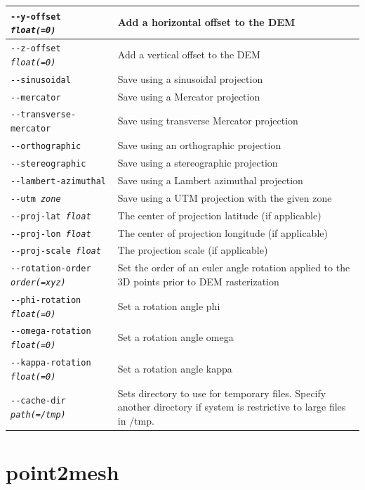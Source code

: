 \begin{longtable}{|l|p{10cm}|}
\texttt{-\/-y-offset \textit{float(=0)}} & Add a horizontal offset to the \ac{DEM} \\ \hline
\texttt{-\/-z-offset \textit{float(=0)}} & Add a vertical offset to the \ac{DEM} \\ \hline
\texttt{-\/-sinusoidal} & Save using a sinusoidal projection \\ \hline
\texttt{-\/-mercator} & Save using a Mercator projection \\ \hline
\texttt{-\/-transverse-mercator} & Save using transverse Mercator projection \\ \hline
\texttt{-\/-orthographic} & Save using an orthographic projection \\ \hline
\texttt{-\/-stereographic} & Save using a stereographic projection \\ \hline
\texttt{-\/-lambert-azimuthal} & Save using a Lambert azimuthal projection \\ \hline
\texttt{-\/-utm \textit{zone}} & Save using a UTM projection with the given zone \\ \hline
\texttt{-\/-proj-lat \textit{float}} & The center of projection latitude (if applicable) \\ \hline
\texttt{-\/-proj-lon \textit{float}} & The center of projection longitude (if applicable) \\ \hline
\texttt{-\/-proj-scale \textit{float}} & The projection scale (if applicable) \\ \hline
\texttt{-\/-rotation-order \textit{order(=xyz)}} & Set the order of an euler angle rotation applied to the 3D points prior to \ac{DEM} rasterization \\ \hline
\texttt{-\/-phi-rotation \textit{float(=0)}} & Set a rotation angle phi \\ \hline
\texttt{-\/-omega-rotation \textit{float(=0)}} & Set a rotation angle omega \\ \hline
\texttt{-\/-kappa-rotation \textit{float(=0)}} & Set a rotation angle kappa \\ \hline
\texttt{-\/-cache-dir \textit{path(=/tmp)}} & Sets directory to use for temporary files. Specify another directory if system is restrictive to large files in /tmp. \\ \hline
\end{longtable}

\section{point2mesh}
\label{point2mesh}

